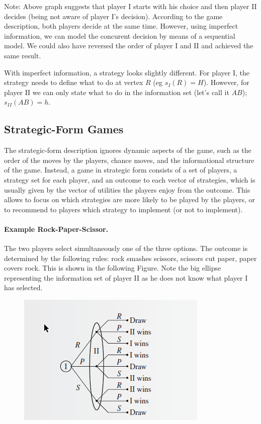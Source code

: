 Note: Above graph suggests that player I starts with his choice and then player II decides (being not aware of player I's decision). According to the game description, both players decide at the same time. However, using imperfect information, we can model the concurent decision by means of a sequential model. We could also have reversed the order of player I and II and achieved the same result.

With imperfect information, a strategy looks slightly different. For player I, the strategy needs to define what to do at vertex $R$ (eg $s_I(R) = H$). However, for player II we can only state what to do in the information set (let's call it $AB$); $s_{II}(AB) = h$.


\subsection{Strategic-Form Games}

The strategic-form description ignores dynamic aspects of the game, such as the order of the moves by the players, chance moves, and the informational structure of the game. Instead, a game in strategic form consists of a set of players, a strategy set for each player, and an outcome to each vector of strategies, which is usually given by the vector of utilities the players enjoy from the outcome. This allows to focus on which strategies are more likely to be played by the players, or to recommend to players which strategy to implement (or not to implement).

\paragraph{Example Rock-Paper-Scissor.} The two players select simultaneously one of the three options. The outcome is determined by the following rules: rock smashes scissors, scissors cut paper, paper covers rock. This is shown in the following Figure. Note the big ellipse representing the information set of player II as he does not know what player I has selected.

\begin{figure}[H]
    \centering
    \includegraphics[scale=1]{images/2023-10-10-game_theory_05.png}
\end{figure}

